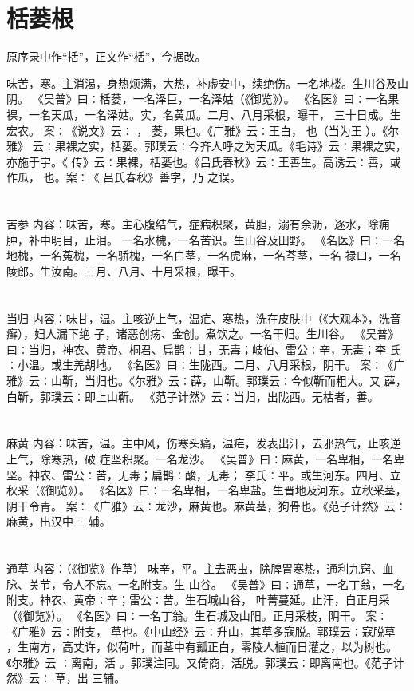 \documentclass[12pt,UTF8]{ctexbook}
\begin{document}
\section{栝蒌根}

原序录中作“括”，正文作“栝”，今据改。

味苦，寒。主消渴，身热烦满，大热，补虚安中，续绝伤。一名地楼。生川谷及山阴。 
《吴普》曰∶栝蒌，一名泽巨，一名泽姑（《御览》）。 
《名医》曰∶一名果裸，一名天瓜，一名泽姑。实，名黄瓜。二月、八月采根，曝干， 
三十日成。生宏农。 
案∶《说文》云∶ ， 蒌，果也。《广雅》云∶王白， 也（当为王 ）。《尔雅》 
云∶果裸之实，栝蒌。郭璞云∶今齐人呼之为天瓜。《毛诗》云∶果裸之实，亦施于宇。《 
传》云∶果裸，栝蒌也。《吕氏春秋》云∶王善生。高诱云∶善，或作瓜， 也。案∶《 
吕氏春秋》善字，乃 之误。 


\section{}苦参
内容：味苦，寒。主心腹结气，症瘕积聚，黄胆，溺有余沥，逐水，除痈肿，补中明目，止泪。 
一名水槐，一名苦识。生山谷及田野。 
《名医》曰∶一名地槐，一名菟槐，一名骄槐，一名白茎，一名虎麻，一名芩茎，一名 
禄曰，一名陵郎。生汝南。三月、八月、十月采根，曝干。 


\section{}当归
内容：味甘，温。主咳逆上气，温疟、寒热，洗在皮肤中（《大观本》，洗音癣），妇人漏下绝 
子，诸恶创疡、金创。煮饮之。一名干归。生川谷。 
《吴普》曰∶当归，神农、黄帝、桐君、扁鹊∶甘，无毒；岐伯、雷公∶辛，无毒；李 
氏∶小温。或生羌胡地。 
《名医》曰∶生陇西。二月、八月采根，阴干。 
案∶《广雅》云∶山靳，当归也。《尔雅》云∶薜，山靳。郭璞云∶今似靳而粗大。又 
薜，白靳，郭璞云∶即上山靳。 
《范子计然》云∶当归，出陇西。无枯者，善。 


\section{}麻黄
内容：味苦，温。主中风，伤寒头痛，温疟，发表出汗，去邪热气，止咳逆上气，除寒热，破 
症坚积聚。一名龙沙。 
《吴普》曰∶麻黄，一名卑相，一名卑坚。神农、雷公∶苦，无毒；扁鹊∶酸，无毒； 
李氏∶平。或生河东。四月、立秋采（《御览》）。 
《名医》曰∶一名卑相，一名卑盐。生晋地及河东。立秋采茎，阴干令青。 
案∶《广雅》云∶龙沙，麻黄也。麻黄茎，狗骨也。《范子计然》云∶麻黄，出汉中三 
辅。 


\section{}通草
内容：（《御览》作草） 
味辛，平。主去恶虫，除脾胃寒热，通利九窍、血脉、关节，令人不忘。一名附支。生 
山谷。 
《吴普》曰∶通草，一名丁翁，一名附支。神农、黄帝∶辛；雷公∶苦。生石城山谷， 
叶菁蔓延。止汗，自正月采（《御览》）。 
《名医》曰∶一名丁翁。生石城及山阳。正月采枝，阴干。 
案∶《广雅》云∶附支， 草也。《中山经》云∶升山，其草多寇脱。郭璞云∶寇脱草 
，生南方，高丈许，似荷叶，而茎中有瓤正白，零陵人植而日灌之，以为树也。《尔雅》云 
∶离南，活 。郭璞注同。又倚商，活脱。郭璞云∶即离南也。《范子计然》云∶ 草，出 
三辅。 
\end{document}
